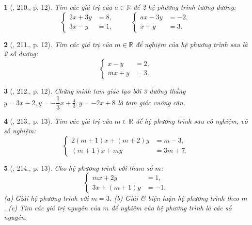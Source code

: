 \documentclass{article}
\newtheorem{baitoan}{}
\begin{document}
\begin{baitoan}[\cite{Binh_Toan_9_tap_2}, 210., p. 12]
	Tìm các giá trị của $a\in\mathbb{R}$ để 2 hệ phương trình tương đương:
	\begin{equation*}
		\left\{\begin{split}
			2x + 3y &= 8,\\
			3x - y &= 1,
		\end{split}\right.\hspace{1cm} \left\{\begin{split}
			ax - 3y &= -2,\\
			x + y &= 3.
		\end{split}\right. 
	\end{equation*}
\end{baitoan}

\begin{baitoan}[\cite{Binh_Toan_9_tap_2}, 211., p. 12]
	Tìm các giá trị của $m\in\mathbb{R}$ để nghiệm của hệ phương trình sau là 2 số dương:
	\begin{equation*}
		\left\{\begin{split}
			x - y &= 2,\\
			mx + y &= 3.
		\end{split}\right.
	\end{equation*}
\end{baitoan}

\begin{baitoan}[\cite{Binh_Toan_9_tap_2}, 212., p. 12]
	Chứng minh tam giác tạo bởi 3 đường thẳng $y = 3x - 2,y = -\dfrac{1}{3}x + \frac{4}{3},y = -2x + 8$ là tam giác vuông cân.
\end{baitoan}

\begin{baitoan}[\cite{Binh_Toan_9_tap_2}, 213., p. 13]
	Tìm các giá trị của $m\in\mathbb{R}$ để hệ phương trình sau vô nghiệm, vô số nghiệm:
	\begin{equation*}
		\left\{\begin{split}
			2(m + 1)x + (m + 2)y &= m - 3,\\
			(m + 1)x + my &= 3m + 7.
		\end{split}\right.
	\end{equation*}
\end{baitoan}

\begin{baitoan}[\cite{Binh_Toan_9_tap_2}, 214., p. 13]
	Cho hệ phương trình với tham số $m$:
	\begin{equation*}
		\left\{\begin{split}
			mx + 2y &= 1,\\
			3x + (m + 1)y &= -1.
		\end{split}\right.
	\end{equation*}
	(a) Giải hệ phương trình với $m = 3$. (b) Giải \& biện luận hệ phương trình theo $m$. (c) Tìm các giá trị nguyên của $m$ để nghiệm của hệ phương trình là các số nguyên.
\end{baitoan}
\end{document}
